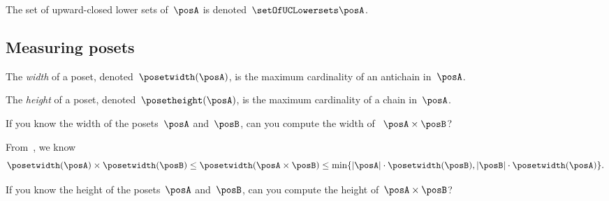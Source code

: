 The set of upward-closed lower sets of~$\posA$ is denoted~$\setOfUCLowersets \posA$.

\subsection{Measuring posets}
\begin{definition}
    \label{def:poset-width}
    The \emph{width} of a poset, denoted~$\posetwidth(\posA)$, is the maximum cardinality of an antichain in~$\posA$.
\end{definition}

\begin{definition}
    \label{def:poset-height}
    The \emph{height} of a poset, denoted~$\posetheight(\posA)$, is the maximum cardinality of a chain in~$\posA$.
\end{definition}

\begin{exercise}
    \label{ex:width}
    If you know the width of the posets~$\posA$ and~$\posB$, can you compute the width of ~$\posA\times\posB$?
\end{exercise}
\begin{solution}
    From~\cite{bezrukovantichains}, we know
    \begin{equation*}
        \posetwidth(\posA)\times \posetwidth(\posB)\leq \posetwidth(\posA\times \posB)\leq \min \{ \vert \posA\vert \cdot \posetwidth(\posB),\vert \posB \vert \cdot \posetwidth(\posA)\}.
    \end{equation*}
\end{solution}

\begin{exercise}
    \label{ex:height}
    If you know the height of the posets~$\posA$ and~$\posB$, can you compute the height of~$\posA\times\posB$?
\end{exercise}

